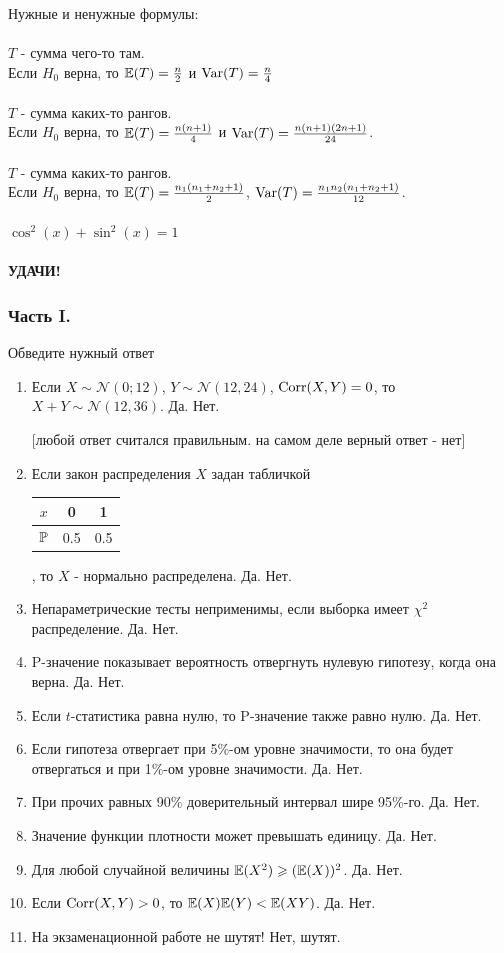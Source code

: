 \documentclass[12pt, a4paper]{article}\usepackage[]{graphicx}\usepackage[]{color}
\begin{document}
Нужные и ненужные формулы: \\ \\
$T$ - сумма чего-то там. \\
Если $H_{0}$ верна, то $\E(T)=\frac{n}{2}$ и $\Var(T)=\frac{n}{4}$ \\ \\
$T$ - сумма каких-то рангов. \\
Если $H_{0}$ верна, то $\E(T)=\frac{n(n+1)}{4}$ и
$\Var(T)=\frac{n(n+1)(2n+1)}{24}$. \\ \\
$T$ - сумма каких-то рангов. \\
Если $H_{0}$ верна, то $\E(T)=\frac{n_{1}(n_{1}+n_{2}+1)}{2}$,
$\Var(T)=\frac{n_{1}n_{2}(n_{1}+n_{2}+1)}{12}$. \\ \\
$\cos^{2}(x)+\sin^{2}(x)=1$ \\ \\

\textbf{УДАЧИ!}

\subsubsection*{Часть I.}

Обведите нужный ответ

\begin{enumerate}
\item Если $X\sim \mathcal{N}(0;12)$, $Y\sim \mathcal{N}(12,24)$, $\Corr(X,Y)=0$, то
$X+Y\sim \mathcal{N}(12,36)$.
Да. Нет.

$[$любой ответ считался правильным. на самом деле верный ответ -
нет$]$

\item Если закон распределения $X$ задан табличкой

\begin{tabular}{|c|c|c|}
  \hline
  $x$ & 0 & 1 \\
  \hline
  $\P$ & 0.5 & 0.5 \\
  \hline
\end{tabular}, то $X$ - нормально распределена. Да. Нет.

\item Непараметрические тесты неприменимы, если выборка имеет
$\chi^{2}$ распределение. Да. Нет.
\item P-значение показывает вероятность отвергнуть нулевую
гипотезу, когда она верна. Да. Нет.
\item Если $t$-статистика равна нулю, то P-значение также равно
нулю. Да. Нет.
\item Если гипотеза отвергает при 5\%-ом уровне значимости, то
она будет отвергаться и при 1\%-ом уровне значимости. Да. Нет.
\item При прочих равных 90\% доверительный интервал шире 95\%-го. Да. Нет.
\item Значение функции плотности может превышать единицу. Да. Нет.
\item Для любой случайной величины  $\E(X^{2} )\ge
(\E(X))^{2}$. Да. Нет.
\item Если $\Corr(X,Y)>0$, то $\E(X)\E(Y)<\E(XY)$. Да. Нет.
\item На экзаменационной работе не шутят! Нет, шутят.
\end{enumerate}
\end{document}
